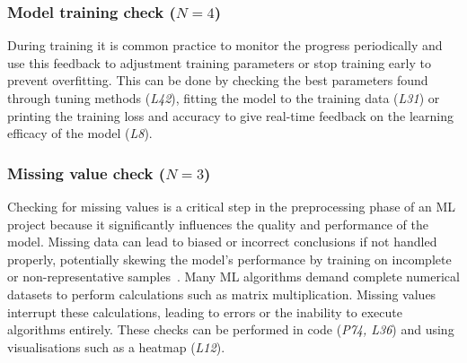 
\subsubsection{Model training check ($N = 4$)}

During training it is common practice to monitor the progress periodically and use this feedback to adjustment training parameters or stop training early to prevent overfitting. This can be done by checking the best parameters found through tuning methods (\emph{L42}), fitting the model to the training data (\emph{L31}) or printing the training loss and accuracy to give real-time feedback on the learning efficacy of the model (\emph{L8}).


\subsubsection{Missing value check ($N = 3$)}

Checking for missing values is a critical step in the preprocessing phase of an ML project because it significantly influences the quality and performance of the model. Missing data can lead to biased or incorrect conclusions if not handled properly, potentially skewing the model's performance by training on incomplete or non-representative samples~\cite{shome2022data}. Many ML algorithms demand complete numerical datasets to perform calculations such as matrix multiplication. Missing values interrupt these calculations, leading to errors or the inability to execute algorithms entirely. These checks can be performed in code (\emph{P74, L36}) and using visualisations such as a heatmap (\emph{L12}).


